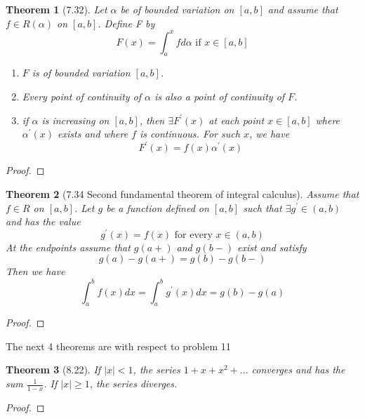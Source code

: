 \documentclass[aps,pra,notitlepage,amsmath,amssymb,letterpaper,12pt]{revtex4-1}
\newtheorem{theorem}{Theorem}
\begin{document}
\begin{theorem}[7.32]
Let $\alpha$ be of bounded variation on $[a,b]$ and assume that
$f \in R(\alpha)$ on $[a,b]$. Define F by
\[F(x)=\int_{a}^{x} f d \alpha \textrm{ if } x \in [a,b]\]
\begin{enumerate}[\upshape a)]
  \item $F$ is of bounded variation $[a,b]$.
  \item Every point of continuity of $\alpha$ is also a point of continuity of $F$.
  \item if $\alpha$ is increasing on $[a,b]$, then $\exists F^\prime(x)$ at each point $x \in [a,b]$ where $\alpha^\prime(x)$ exists and where $f$ is continuous. For such $x$, we have $$F^\prime(x) = f(x)\alpha^\prime(x)$$
\end{enumerate}
\end{theorem}
\begin{proof}
\end{proof}

\begin{theorem}[7.34 Second fundamental theorem of integral calculus]
Assume that $f \in R$ on $[a,b]$. Let $g$ be a function defined on $[a,b]$ such that $\exists g^\prime \in (a,b)$ and has the value
\[g^\prime(x) = f(x) \textrm{ for every } x \in (a,b)\]
At the endpoints assume that $g(a+)$ and $g(b-)$ exist and satisfy
\[g(a) - g(a+) = g(b) - g(b-)\]
Then we have
\[\int_{a}^{b} f(x)dx = \int_{a}^{b} g^\prime(x)dx = g(b) - g(a)\]
\end{theorem}
\begin{proof}
\end{proof}

The next 4 theorems are with respect to problem 11
\begin{theorem}[8.22]
If $|x| < 1$, the series $1 + x + x^2 + ... $  converges and has the sum $\frac{1}{1-x}$. If $|x| \geq 1$, the series diverges.
\end{theorem}
\begin{proof}
\end{proof}
\end{document}
